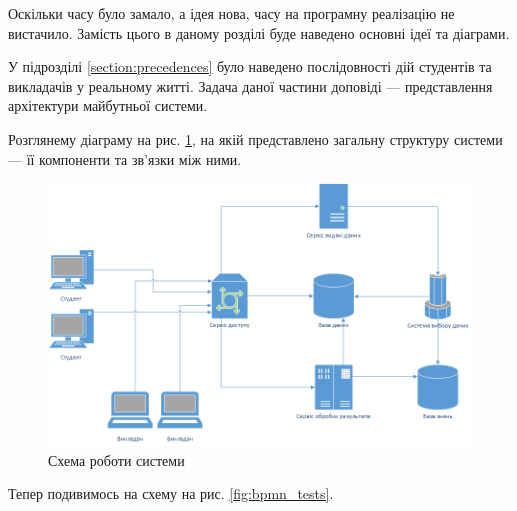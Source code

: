 




Оскільки часу було замало, а ідея нова, часу на програмну реалізацію не
вистачило.
Замість цього в даному розділі буде наведено основні ідеї та діаграми.

У підрозділі \ref{section:precedences} було наведено послідовності дій студентів
та викладачів у реальному житті.
Задача даної частини доповіді --- представлення архітектури майбутньої системи.

Розглянему діаграму на рис. \ref{fig:scheme_main}, на якій представлено загальну
структуру системи --- її компоненти та зв’язки між ними.

\begin{figure}[htbp]
    \center\includegraphics[width=\textwidth]{images/scheme_main.png}
    \caption{Схема роботи системи}
    \label{fig:scheme_main}
\end{figure}

Тепер подивимось на схему на рис. \ref{fig:bpmn_tests}.

